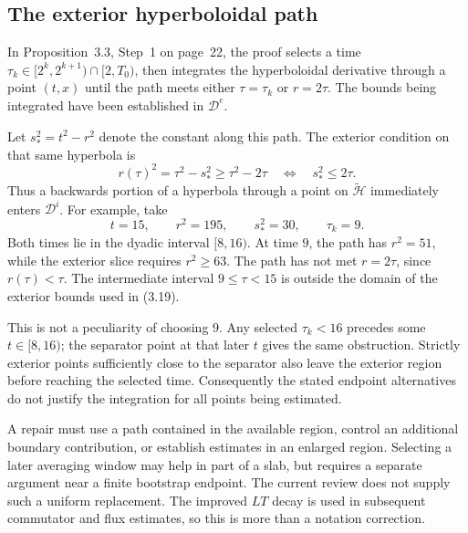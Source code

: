 \documentclass[10pt]{article}
\begin{document}
\subsection*{The exterior hyperboloidal path}
In Proposition 3.3, Step 1 on page 22, the proof selects a time \(\tau_k\in[2^k,2^{k+1})\cap[2,T_0)\), then integrates the hyperboloidal derivative through a point \((t,x)\) until the path meets either \(\tau=\tau_k\) or \(r=2\tau\). The bounds being integrated have been established in \(\mathcal D^e\).\par
Let \(s_*^2=t^2-r^2\) denote the constant along this path. The exterior condition on that same hyperbola is \[r(\tau)^2=\tau^2-s_*^2\geq\tau^2-2\tau
 \quad\Longleftrightarrow\quad s_*^2\leq2\tau.\] Thus a backwards portion of a hyperbola through a point on \(\widetilde{\mathcal H}\) immediately enters \(\mathcal D^i\). For example, take \[t=15,\qquad r^2=195,\qquad s_*^2=30,\qquad \tau_k=9.\] Both times lie in the dyadic interval \([8,16)\). At time \(9\), the path has \(r^2=51\), while the exterior slice requires \(r^2\geq63\). The path has not met \(r=2\tau\), since \(r(\tau)<\tau\). The intermediate interval \(9\leq\tau<15\) is outside the domain of the exterior bounds used in (3.19).\par
This is not a peculiarity of choosing \(9\). Any selected \(\tau_k<16\) precedes some \(t\in[8,16)\); the separator point at that later \(t\) gives the same obstruction. Strictly exterior points sufficiently close to the separator also leave the exterior region before reaching the selected time. Consequently the stated endpoint alternatives do not justify the integration for all points being estimated.\par
A repair must use a path contained in the available region, control an additional boundary contribution, or establish estimates in an enlarged region. Selecting a later averaging window may help in part of a slab, but requires a separate argument near a finite bootstrap endpoint. The current review does not supply such a uniform replacement. The improved \(LT\) decay is used in subsequent commutator and flux estimates, so this is more than a notation correction.\par
\end{document}
